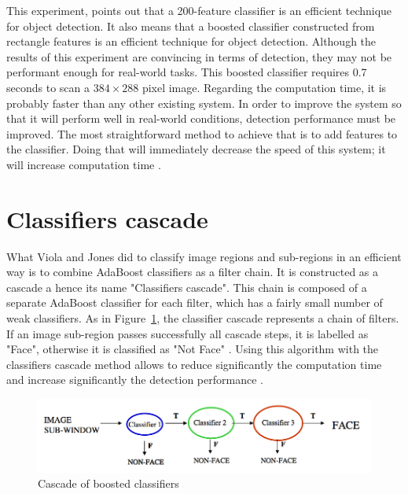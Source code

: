 \noindent This experiment, points out that a 200-feature classifier is an efficient technique for object detection. It also means that a boosted classifier constructed from rectangle features is an efficient technique for object detection. Although the results of this experiment are convincing in terms of detection, they may not be performant enough for real-world tasks. This boosted classifier requires 0.7 seconds to scan a $ 384\times288 $ pixel image. Regarding the computation time, it is probably faster than any other existing system. In order to improve the system so that it will perform well in real-world conditions, detection performance must be improved. The most straightforward method to achieve that is to add features to the classifier. Doing that will immediately decrease the speed of this system; it will increase computation time \cite{VIO01}.
\newline

\section{Classifiers cascade}

\vspace{\baselineskip}
\noindent What Viola and Jones did to classify image regions and sub-regions in an efficient way is to combine AdaBoost classifiers as a filter chain. It is constructed as a cascade a hence its name  "Classifiers cascade". This chain is composed of a separate AdaBoost classifier for each filter, which has a fairly small number of weak classifiers. As in Figure~\ref{haar_feature_cascade}, the classifier cascade represents a chain of filters. If an image sub-region passes successfully all cascade steps, it is labelled as "Face", otherwise it is classified as "Not Face" \cite{HEW07}. Using this algorithm with the classifiers cascade method allows to reduce significantly the computation time and increase significantly the detection performance \cite{VIO01}.
\newline

\begin{figure}[!h]
\begin{center}
\noindent \includegraphics[scale=0.5]{figures/haar_feature_cascade} 
\newline
\caption{Cascade of boosted classifiers}
\label{haar_feature_cascade}
\end{center} 
\end{figure}

